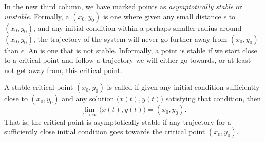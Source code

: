 In the new third column,
we have marked points as \emph{asymptotically stable} or \emph{unstable}.  Formally, a
\emph{} $(x_0,y_0)$ is one where given any small distance $\epsilon$ to
$(x_0,y_0)$, and any initial condition within a perhaps smaller radius
around $(x_0,y_0)$, the trajectory
of the system will never go further away from $(x_0,y_0)$ than $\epsilon$.
An \emph{} is one that is not stable.
Informally, a point is stable if we start close to a critical point and
follow a trajectory we will either go towards, or at least not get away
from,
this critical point.

A stable critical point $(x_0,y_0)$ is called \emph{} if
given any initial condition sufficiently close to $(x_0,y_0)$ and any
solution $\bigl( x(t), y(t) \bigr)$ satisfying that condition, then
\begin{equation*}
\lim_{t \to \infty} \bigl( x(t), y(t) \bigr) = (x_0,y_0) .
\end{equation*}
That is, the critical point is asymptotically stable
if any trajectory for a sufficiently close initial condition
goes towards the critical point $(x_0,y_0)$.

